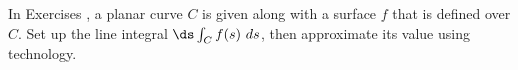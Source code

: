 {\noindent In Exercises}
{, a planar curve $C$ is given along with a surface $f$ that is defined over $C$. Set up the line integral $\ds \int_Cf(s)\ ds$, then approximate its value using technology.}
